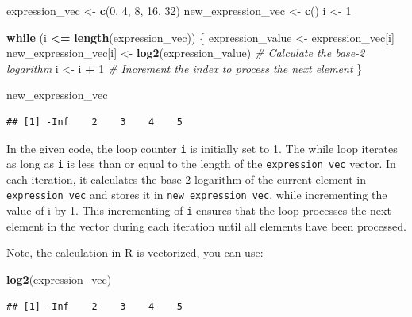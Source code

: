 \documentclass[
]{book}
\newenvironment{Shaded}{\begin{snugshade}}{\end{snugshade}}
\newcommand{\CommentTok}[1]{\textcolor[rgb]{0.56,0.35,0.01}{\textit{#1}}}
\newcommand{\ControlFlowTok}[1]{\textcolor[rgb]{0.13,0.29,0.53}{\textbf{#1}}}
\newcommand{\DecValTok}[1]{\textcolor[rgb]{0.00,0.00,0.81}{#1}}
\newcommand{\FunctionTok}[1]{\textcolor[rgb]{0.13,0.29,0.53}{\textbf{#1}}}
\newcommand{\NormalTok}[1]{#1}
\newcommand{\OtherTok}[1]{\textcolor[rgb]{0.56,0.35,0.01}{#1}}
\newcommand{\SpecialCharTok}[1]{\textcolor[rgb]{0.81,0.36,0.00}{\textbf{#1}}}
\begin{document}
\begin{Shaded}
\begin{Highlighting}[]
\NormalTok{expression\_vec }\OtherTok{\textless{}{-}} \FunctionTok{c}\NormalTok{(}\DecValTok{0}\NormalTok{, }\DecValTok{4}\NormalTok{, }\DecValTok{8}\NormalTok{, }\DecValTok{16}\NormalTok{, }\DecValTok{32}\NormalTok{)}
\NormalTok{new\_expression\_vec }\OtherTok{\textless{}{-}} \FunctionTok{c}\NormalTok{()}
\NormalTok{i }\OtherTok{\textless{}{-}} \DecValTok{1}

\ControlFlowTok{while}\NormalTok{ (i }\SpecialCharTok{\textless{}=} \FunctionTok{length}\NormalTok{(expression\_vec)) \{}
\NormalTok{  expression\_value }\OtherTok{\textless{}{-}}\NormalTok{ expression\_vec[i]}
\NormalTok{  new\_expression\_vec[i] }\OtherTok{\textless{}{-}} \FunctionTok{log2}\NormalTok{(expression\_value)  }\CommentTok{\# Calculate the base{-}2 logarithm}
\NormalTok{  i }\OtherTok{\textless{}{-}}\NormalTok{ i }\SpecialCharTok{+} \DecValTok{1}  \CommentTok{\# Increment the index to process the next element}
\NormalTok{\}}

\NormalTok{new\_expression\_vec}
\end{Highlighting}
\end{Shaded}

\begin{verbatim}
## [1] -Inf    2    3    4    5
\end{verbatim}

In the given code, the loop counter \texttt{i} is initially set to 1. The while loop iterates as long as \texttt{i} is less than or equal to the length of the \texttt{expression\_vec} vector. In each iteration, it calculates the base-2 logarithm of the current element in \texttt{expression\_vec} and stores it in \texttt{new\_expression\_vec}, while incrementing the value of i by 1. This incrementing of \texttt{i} ensures that the loop processes the next element in the vector during each iteration until all elements have been processed.

Note, the calculation in R is vectorized, you can use:

\begin{Shaded}
\begin{Highlighting}[]
\FunctionTok{log2}\NormalTok{(expression\_vec)}
\end{Highlighting}
\end{Shaded}

\begin{verbatim}
## [1] -Inf    2    3    4    5
\end{verbatim}
\end{document}
